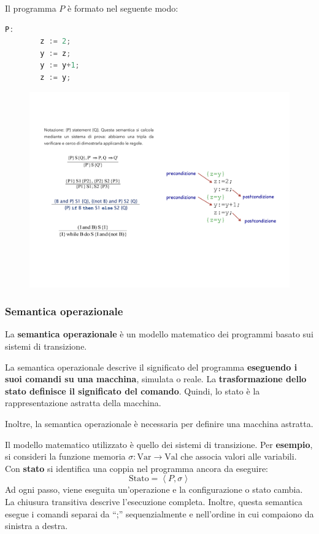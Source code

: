 \documentclass[a4paper]{article}
\newcommand{\dquotes}[1]{``#1''}
\begin{document}
	\noindent
	Il programma $P$ è formato nel seguente modo:
	\begin{lstlisting}[language=C]
		P:
		z := 2;
		y := z;
		y := y+1;
		z := y;\end{lstlisting}
	\begin{figure}[!htp]
		\centering
		\includegraphics[width=\textwidth]{img/eg-semantica_assiomatica.pdf}
	\end{figure}\newpage

	\subsubsection{Semantica operazionale}
	
	La \textcolor{Red3}{\textbf{semantica operazionale}} è un modello matematico dei programmi basato sui sistemi di transizione.\newline
	
	\noindent
	La semantica operazionale descrive il significato del programma \textbf{eseguendo i suoi comandi su una macchina}, simulata o reale. La \textbf{trasformazione dello stato definisce il significato del comando}. Quindi, lo stato è la rappresentazione astratta della macchina.
	
	Inoltre, la semantica operazionale è necessaria per definire una macchina astratta.\newline
	
	\noindent
	Il modello matematico utilizzato è quello dei sistemi di transizione. Per \textcolor{Green4}{\textbf{esempio}}, si consideri la funzione memoria $\sigma: \mathrm{Var} \rightarrow \mathrm{Val}$ che associa valori alle variabili. Con \textbf{stato} si identifica una coppia nel programma ancora da eseguire:
	\begin{equation*}
		\mathrm{Stato} = \left\langle P,\sigma \right\rangle
	\end{equation*}
	Ad ogni passo, viene eseguita un'operazione e la configurazione o stato cambia. La chiusura transitiva descrive l'esecuzione completa.\newline
	Inoltre, questa semantica esegue i comandi separai da \dquotes{;} sequenzialmente e nell'ordine in cui compaiono da sinistra a destra.
	
\end{document}
